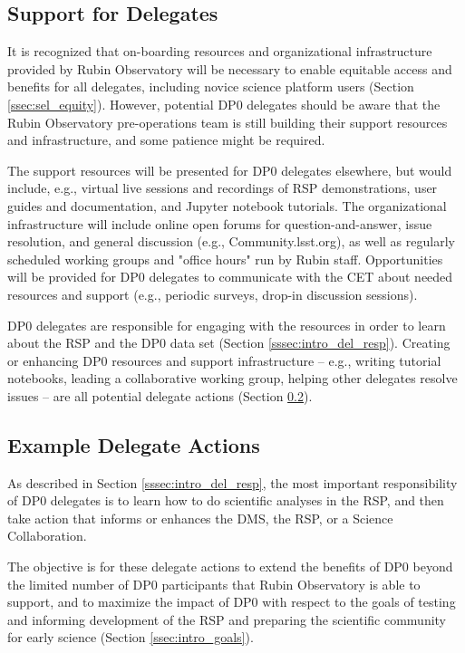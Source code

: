 \documentclass[DM,lsstdraft,authoryear,toc]{lsstdoc}
\begin{document}
\subsection{Support for Delegates}\label{ssec:res_sup}

It is recognized that on-boarding resources and organizational infrastructure provided by Rubin Observatory will be necessary to enable equitable access and benefits for all delegates, including novice science platform users (Section \ref{ssec:sel_equity}). 
However, potential DP0 delegates should be aware that the Rubin Observatory pre-operations team is still building their support resources and infrastructure, and some patience might be required. 

The support resources will be presented for DP0 delegates elsewhere, but would include, e.g., virtual live sessions and recordings of RSP demonstrations, user guides and documentation, and Jupyter notebook tutorials.
The organizational infrastructure will include online open forums for question-and-answer, issue resolution, and general discussion (e.g., Community.lsst.org), as well as regularly scheduled working groups and "office hours" run by Rubin staff.
Opportunities will be provided for DP0 delegates to communicate with the CET about needed resources and support (e.g., periodic surveys, drop-in discussion sessions).

DP0 delegates are responsible for engaging with the resources in order to learn about the RSP and the DP0 data set (Section \ref{sssec:intro_del_resp}).
Creating or enhancing DP0 resources and support infrastructure -- e.g., writing tutorial notebooks, leading a collaborative working group, helping other delegates resolve issues -- are all potential delegate actions (Section \ref{ssec:res_act}).

\subsection{Example Delegate Actions}\label{ssec:res_act}

As described in Section \ref{sssec:intro_del_resp}, the most important responsibility of DP0 delegates is to learn how to do scientific analyses in the RSP, and then take action that informs or enhances the DMS, the RSP, or a Science Collaboration. 

The objective is for these delegate actions to extend the benefits of DP0 beyond the limited number of DP0 participants that Rubin Observatory is able to support, and to maximize the impact of DP0 with respect to the goals of testing and informing development of the RSP and preparing the scientific community for early science (Section \ref{ssec:intro_goals}). 
\end{document}
